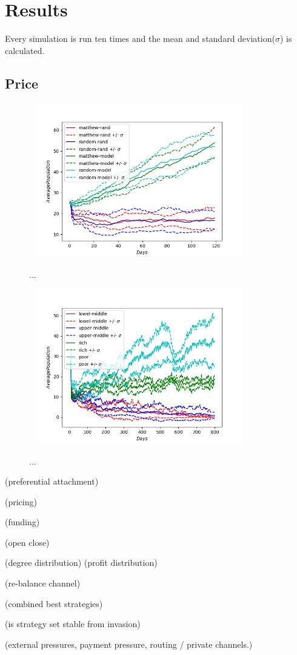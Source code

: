 \chapter{Results}

Every simulation is run ten times and the mean and standard deviation($\sigma$) is calculated. 

\section{Price}

\begin{figure}[!htb]
	\hspace*{-1cm}\ 
	\centering
	\includegraphics[width=9cm]{images/histories_deviation.png}
	\caption{ ...
	}
	\label{fig:hist_dev}
	\hspace*{2mm} 
\end{figure}

\begin{figure}[!htb]
	\hspace*{-1cm}\ 
	\centering
	\includegraphics[width=9cm]{images/histories_deviation_fund.png}
	\caption{ ...
	}
	\label{fig:alloc}
	\hspace*{2mm} 
\end{figure}


(preferential attachment)

(pricing)

(funding)

(open close)

(degree distribution)
(profit distribution)

(re-balance channel)

(combined best strategies)

(is strategy set stable from invasion)

(external pressures, payment pressure, routing / private channels.)
